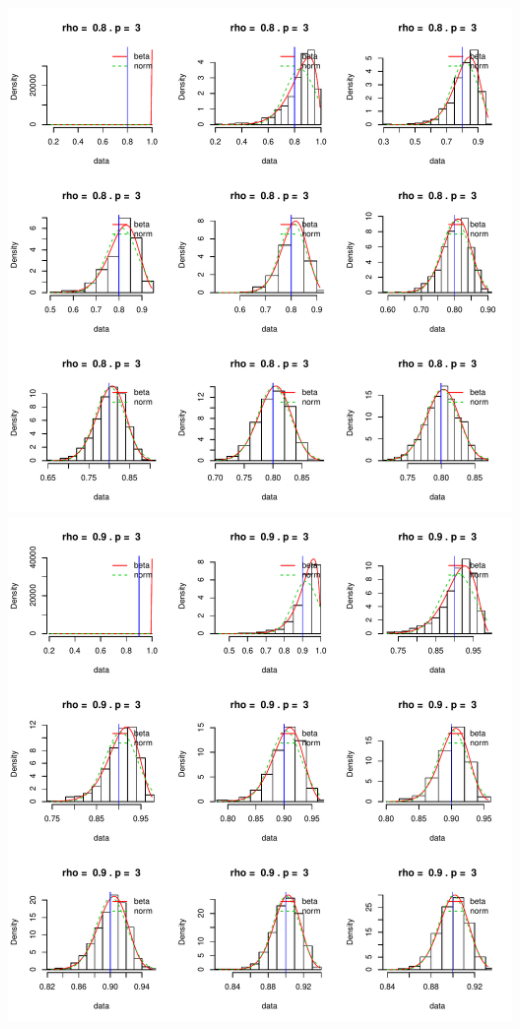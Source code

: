 \documentclass[]{article}
\begin{document}
\includegraphics{2016_w09_files/figure-latex/unnamed-chunk-15-9.pdf}
\includegraphics{2016_w09_files/figure-latex/unnamed-chunk-15-10.pdf}
\end{document}
